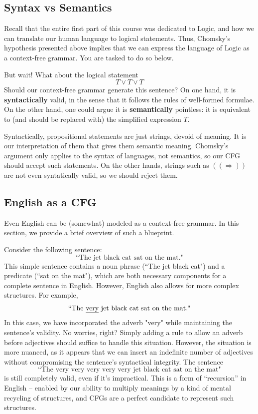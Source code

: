 \documentclass{article}
\begin{document}
\subsection*{Syntax vs Semantics}
    Recall that the entire first part of this course was dedicated to Logic, and how we can translate our human language to logical statements. Thus, Chomsky's hypothesis presented above implies that we can express the language of Logic as a context-free grammar. You are tasked to do so below. 
    

    \vspace{2mm}
    But wait! What about the logical statement $$T \lor T \lor T$$ Should our context-free grammar generate this sentence? On one hand, it is \textbf{syntactically} valid, in the sense that it follows the rules of well-formed formulae. On the other hand, one could argue it is \textbf{semantically} pointless: it is equivalent to (and should be replaced with) the simplified expression $T$.

    \vspace{2mm}
    Syntactically, propositional statements are just strings, devoid of meaning. It is our interpretation of them that gives them semantic meaning. Chomsky's argument only applies to the syntax of languages, not semantics, so our CFG should accept such statements. On the other hands, strings such as $((\Rightarrow))$ are not even syntatically valid, so we should reject them.


\subsection*{English as a CFG}
    Even English can be (somewhat) modeled as a context-free grammar. In this section, we provide a brief overview of such a blueprint.
    
    \vspace{2mm}
    Consider the following sentence:$$\text{``The jet black cat sat on the mat."}$$ This simple sentence contains a noun phrase (``The jet black cat") and a predicate (``sat on the mat"), which are both necessary components for a complete sentence in English. However, English also allows for more complex structures. For example, $$\text{``The \underline{very} jet black cat sat on the mat."}$$ In this case, we have incorporated the adverb "very" while maintaining the sentence's validity. No worries, right? Simply adding a rule to allow an adverb before adjectives should suffice to handle this situation. However, the situation is more nuanced, as it appears that we can insert an indefinite number of adjectives without compromising the sentence's syntactical integrity. The sentence $$\text{``The very very very very very jet black cat sat on the mat"}$$ is still completely valid, even if it's impractical. This is a form of “recursion” in English -- enabled by our ability to multiply meanings by a kind of mental recycling of structures, and CFGs are a perfect candidate to represent such structures.
\end{document}
